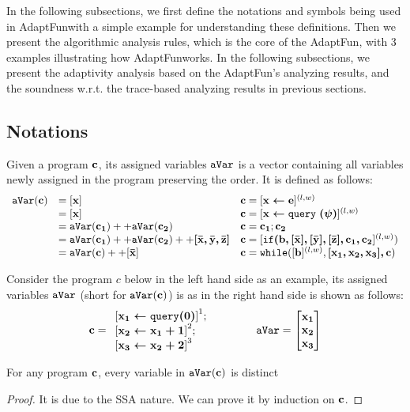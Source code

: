 \documentclass[a4paper,11pt]{article}
\newcommand{\THESYSTEM}{\textsf{AdaptFun}}
\begin{document}
In the following subsections, 
we first define the notations and symbols being used in \THESYSTEM  with a simple example for understanding these definitions. 
Then we present the algorithmic analysis rules, which is the core of the \THESYSTEM, with
3 examples illustrating how \THESYSTEM  works.
In the following subsections, we present the adaptivity analysis based on the \THESYSTEM's analyzing results, and the soundness w.r.t. the trace-based analyzing results in previous sections.

\subsection{Notations}
%
\label{subsec:alg_notation}
%
\begin{defn}
Given a program $\boldsymbol{\mathbf{c}}$, its assigned variables $\mathtt{aVar}$ is a vector containing all variables newly assigned in the program preserving the order. It is defined as follows:
$$
\begin{array}{lll}
   \mathtt{aVar}(\boldsymbol{\mathbf{c}}) 	
   		& = [\boldsymbol{\mathbf{x}}] 									
   		& \boldsymbol{\mathbf{c}} 	= 
   			[\boldsymbol{\mathbf{\mathrel{ x \leftarrow e }}}]^{(l, w)} \\
     	& = [\boldsymbol{\mathbf{x}}] 									
     	& \boldsymbol{\mathbf{c}} 	= 
     		[\boldsymbol{\mathbf{\mathrel{ x \leftarrow {\tt query} }(\psi)}}]^{(l, w)} \\
     	& = \mathtt{aVar}(\boldsymbol{\mathbf{c_1}}) ++ \mathtt{aVar} (\boldsymbol{\mathbf{c_2}}) 	
     	& \boldsymbol{\mathbf{c}} 	= \boldsymbol{\mathbf{c_1}};\boldsymbol{\mathbf{c_2}}\\
     	& = \mathtt{aVar}(\boldsymbol{\mathbf{c_1}}) ++ \mathtt{aVar} (\boldsymbol{\mathbf{c_2}}) 
     	++ \boldsymbol{\mathbf{[\bar{x}, \bar{y}, \bar{z}]}} 
     	& \boldsymbol{\mathbf{c}} 	= 
     	[\boldsymbol{\mathbf{\mathtt{if} (b ,[\bar{x}], [\bar{y}], [\bar{z}], c_1, c_2}}]^{(l, w)}) \\
     	& = \mathtt{aVar}(\boldsymbol{\mathbf{c}}) ++ [\boldsymbol{\mathbf{\bar{x}}}]
     	& \boldsymbol{\mathbf{c}} 	= \mathtt{while} ([\boldsymbol{\mathbf{b}}]^{(l, w)}, \boldsymbol{\mathbf{[x_1,x_2,x_3], {c}}})
\end{array}
$$
\end{defn}
%
Consider the program $c$ below in the left hand side as an example, its assigned variables $\mathtt{aVar}$ (short for $\mathtt{aVar}(\boldsymbol{\mathbf{c}})$) is as in the right hand side is shown as follows:
$$
\ssa{c} = 
\begin{array}{l}
\left[\ssa{\assign {x_1} {\query(0)}}		\right]^1;
\\
\left[\ssa{\assign {x_2} {x_1 + 1}}		\right]^2;
\\
\left[\ssa{\assign {x_3} {x_2 + 2}}		\right]^3
\end{array}
~~~~~~~~~~~~
\avar = \left [ 
\begin{matrix}
\ssa{x_1} \\
\ssa{x_2} \\
\ssa{x_3} \\
\end{matrix} \right ]
$$
%
\begin{lem}
For any program $\boldsymbol{\mathbf{c}}$, every variable in $\mathtt{aVar}(\boldsymbol{\mathbf{c}})$ is distinct
\end{lem}
\begin{proof}
 It is due to the SSA nature. We can prove it by induction on $\boldsymbol{\mathbf{c}}$.
\end{proof}
\end{document}
